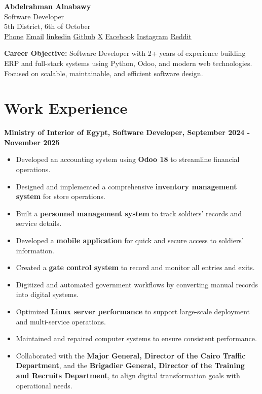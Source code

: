 \documentclass[a4paper,12pt]{article}
\begin{document}
\begin{center}
{\Huge \textbf{Abdelrahman Alnabawy}}\\[-0.0em]
{\Large Software Developer}\\[0.2em]
{5th District, 6th of October}\\
{\href{tel:+201554867970}{Phone}}
{\href{mailto:abderahman.elnabawy@gmail.com}{Email}}
{\href{https://www.linkedin.com/in/abdelrahman-elnabawy-363b63353/}{linkedin}}
{\href{https://github.com/abdelrahmanelnabawy}{Github}}
{\href{https://x.com/Abdelraalnabawy}{X}}
{\href{https://www.facebook.com/profile.php?id=61569052322072}{Facebook}}
{\href{https://www.instagram.com/abderahman.elnabawy/}{Instagram}}
{\href{https://www.reddit.com/user/Ok-Database3374/}{Reddit}}

\end{center}

\vspace{-1.3em}
\noindent\textbf{Career Objective:} Software Developer with 2+ years of experience building ERP and full-stack systems using Python, Odoo, and modern web technologies. Focused on scalable, maintainable, and efficient software design.
\vspace{-1.9em}
\section*{Work Experience}
\vspace{-1em}

\noindent\textbf{Ministry of Interior of Egypt, Software Developer, September 2024 - November 2025}\\[-1.2em]
\begin{itemize}[nosep]
    \item Developed an accounting system using \textbf{Odoo 18} to streamline financial operations.
    \item Designed and implemented a comprehensive \textbf{inventory management system} for store operations.
    \item Built a \textbf{personnel management system} to track soldiers’ records and service details.
    \item Developed a \textbf{mobile application} for quick and secure access to soldiers’ information.
    \item Created a \textbf{gate control system} to record and monitor all entries and exits.
    \item Digitized and automated government workflows by converting manual records into digital systems.
    \item Optimized \textbf{Linux server performance} to support large-scale deployment and multi-service operations.
    \item Maintained and repaired computer systems to ensure consistent performance.
    \item Collaborated with the \textbf{Major General, Director of the Cairo Traffic Department}, and the \textbf{Brigadier General, Director of the Training and Recruits Department}, to align digital transformation goals with operational needs.
\end{itemize}
\end{document}

